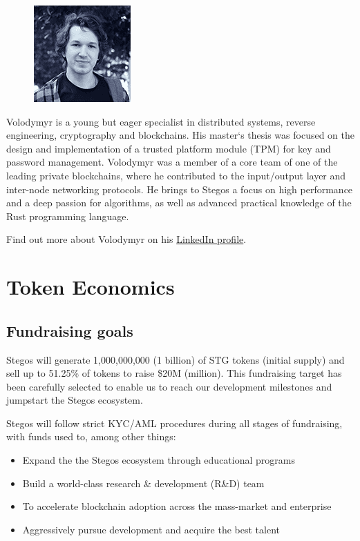 \documentclass[8pt,fleqn,openany]{book}
\begin{document}
{
\setlength\intextsep{0pt}
\begin{figure}
	\includegraphics{images/team/team-6.png}
\end{figure}

Volodymyr is a young but eager specialist in distributed systems, reverse engineering, cryptography and blockchains. His master`s thesis was focused on the design and implementation of a trusted platform module (TPM) for key and password management. Volodymyr was a member of a core team of one of the leading private blockchains, where he contributed to the input/output layer and inter-node networking protocols. He brings to Stegos a focus on high performance and a deep passion for algorithms, as well as advanced practical knowledge of the Rust programming language.

Find out more about Volodymyr on his \href{https://linkedin.com/in/vldm}{LinkedIn profile}.
}

\chapter{Token Economics}\label{app:token-economics}

\section{Fundraising goals}
Stegos will generate 1,000,000,000 (1 billion) of STG tokens (initial supply) and sell up to 51.25\% of tokens to raise \$20M (million). This fundraising target has been carefully selected to enable us to reach our development milestones and jumpstart the Stegos ecosystem.

Stegos will follow strict KYC/AML procedures during all stages of fundraising, with funds used to, among other things:

\begin{itemize}
	\item Expand the the Stegos ecosystem through educational programs
	\item Build a world-class research \& development (R\&D) team
	\item To accelerate blockchain adoption across the mass-market and enterprise
	\item Aggressively pursue development and acquire the best talent
\end{itemize}
\end{document}

